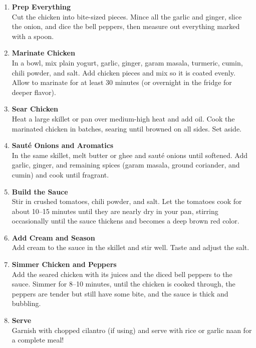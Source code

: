 \begin{enumerate}

      \item \textbf{Prep Everything} \\
            Cut the chicken into bite-sized pieces. Mince all the garlic and ginger, slice the onion, and dice the bell peppers, then measure out everything marked with a spoon.

      \item \textbf{Marinate Chicken} \\
            In a bowl, mix plain yogurt, garlic, ginger, garam masala, turmeric, cumin, chili powder, and salt. Add chicken pieces and mix so it is coated evenly. Allow to marinate for at least 30 minutes (or overnight in the fridge for deeper flavor).

      \item \textbf{Sear Chicken} \\
            Heat a large skillet or pan over medium-high heat and add oil. Cook the marinated chicken in batches, searing until browned on all sides. Set aside.

      \item \textbf{Sauté Onions and Aromatics} \\
            In the same skillet, melt butter or ghee and sauté onions until softened. Add garlic, ginger, and remaining spices (garam masala, ground coriander, and cumin) and cook until fragrant.

      \item \textbf{Build the Sauce} \\
            Stir in crushed tomatoes, chili powder, and salt. Let the tomatoes cook for about 10--15 minutes until they are nearly dry in your pan, stirring occasionally until the sauce thickens and becomes a deep brown red color.

      \item \textbf{Add Cream and Season} \\
            Add cream to the sauce in the skillet and stir well. Taste and adjust the salt.

      \item \textbf{Simmer Chicken and Peppers} \\
            Add the seared chicken with its juices and the diced bell peppers to the sauce. Simmer for 8--10 minutes, until the chicken is cooked through, the peppers are tender but still have some bite, and the sauce is thick and bubbling.

      \item \textbf{Serve} \\
            Garnish with chopped cilantro (if using) and serve with rice or garlic naan for a complete meal!

\end{enumerate}


